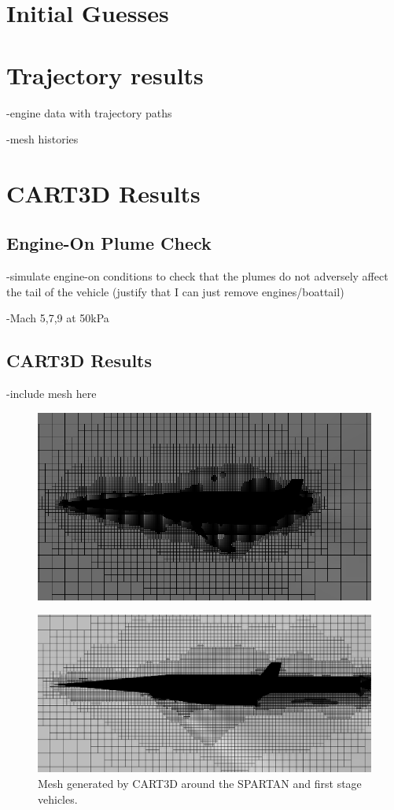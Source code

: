 \chapter{Initial Guesses}


\chapter{Trajectory results}

-engine data with trajectory paths

-mesh histories




\chapter{CART3D Results}

\section{Engine-On Plume Check}
-simulate engine-on conditions to check that the plumes do not adversely affect the tail of the vehicle (justify that I can just remove engines/boattail)

-Mach 5,7,9 at 50kPa

\section{CART3D Results}
-include mesh here

\begin{figure}
	\centering
	\includegraphics[width=0.7\linewidth]{figures/3_vehicle_design/M3AoA6GRID}
	\caption{}
	\label{fig:M3AoA6GRID}
\end{figure}

		\begin{figure}
			\centering
			\includegraphics[width=0.7\linewidth]{figures/3_vehicle_design/CARTmesh}
			\caption{ Mesh generated by CART3D around the SPARTAN and first stage vehicles.}
			\label{fig:CARTmesh}
		\end{figure}
		
